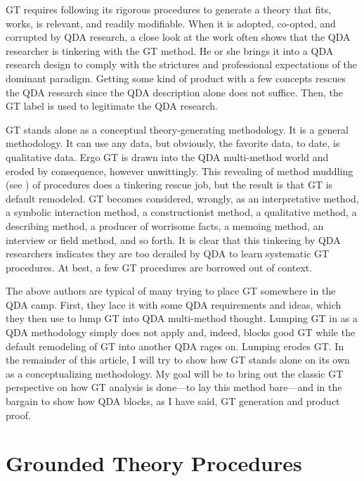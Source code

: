 GT requires following its rigorous procedures to generate a theory that fits, works, is relevant, and readily modifiable. 
When it is adopted, co-opted, and corrupted by QDA research, a close look at the work often shows that the QDA researcher is tinkering with the GT method. 
He or she brings it into a QDA research design to comply with the strictures and professional expectations of the dominant paradigm. 
Getting some kind of product with a few concepts rescues the QDA research since the QDA description alone does not suffice.
Then, the GT label is used to legitimate the QDA research.

GT stands alone as a conceptual theory-generating methodology. 
It is a general methodology. 
It can use any data, but obviously, the favorite data, to date, is qualitative data. 
Ergo GT is drawn into the QDA multi-method world and eroded by consequence, however unwittingly. 
This revealing of method muddling
(see \citep{article.cynthia92})
of procedures does a tinkering rescue job, but the result is that GT is default remodeled. 
GT becomes considered, wrongly, as an interpretative method, a symbolic interaction method, a constructionist method, a qualitative method, a describing method, a producer of worrisome facts, a memoing method, an interview or field method, and so forth. 
It is clear that this tinkering by QDA researchers indicates they are too derailed by QDA to learn systematic GT procedures. 
At best, a few GT procedures are borrowed out of context.

The above authors are typical of many trying to place GT somewhere in the QDA camp. 
First, they lace it with some QDA requirements and ideas, which
they then use to lump GT into QDA multi-method thought. 
Lumping GT in as a QDA methodology simply does not apply and, indeed, blocks good GT while the default remodeling of GT into another QDA rages on. 
Lumping erodes GT. 
In the remainder of this article, I will try to show how GT stands alone on its own as a conceptualizing methodology. 
My goal will be to bring out the classic GT perspective on how GT analysis is done—to lay this method bare—and in the bargain to show how QDA blocks, as I have said, GT generation and product proof.

\section*{Grounded Theory Procedures}

